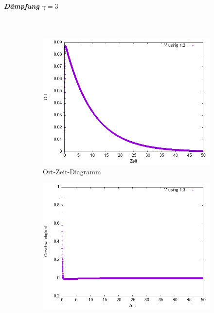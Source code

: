 \documentclass[
    oneside,
    ngerman,
    footinclude=false,
    captions=tableheading,
    DIV=12
]{scrartcl}
\begin{document}
               \subparagraph{Dämpfung $\gamma=3$}\,
               \begin{figure}[H]
                   \centering
                   \begin{subfigure}[b]{0.45\textwidth}
                       \centering
                       \includegraphics[width=\textwidth]{Bilddateien/VVA1(b)-001-10-x.png}
                       \caption{Ort-Zeit-Diagramm}
                       \label{fig:VVA1(a)-001-10-x}
                   \end{subfigure}
                   \hfill
                   \begin{subfigure}[b]{0.45\textwidth}
                       \centering
                       \includegraphics[width=\textwidth]{Bilddateien/VVA1(b)-001-10-v.png}

\end{subfigure}
\end{figure}
\end{document}
